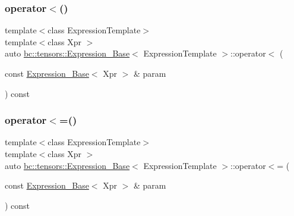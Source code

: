 \subsubsection{\texorpdfstring{operator$<$()}{operator<()}\hspace{0.1cm}{\footnotesize\ttfamily [2/2]}}
{\footnotesize\ttfamily template$<$class Expression\+Template$>$ \\
template$<$class Xpr $>$ \\
auto \hyperlink{classbc_1_1tensors_1_1Expression__Base}{bc\+::tensors\+::\+Expression\+\_\+\+Base}$<$ Expression\+Template $>$\+::operator$<$ (\begin{DoxyParamCaption}\item[{const \hyperlink{classbc_1_1tensors_1_1Expression__Base}{Expression\+\_\+\+Base}$<$ Xpr $>$ \&}]{param }\end{DoxyParamCaption}) const\hspace{0.3cm}{\ttfamily [inline]}}

\mbox{\label{classbc_1_1tensors_1_1Expression__Base_a4bd234d71327653d4aa3b9fd7db21acd}} 
\subsubsection{\texorpdfstring{operator$<$=()}{operator<=()}\hspace{0.1cm}{\footnotesize\ttfamily [1/2]}}
{\footnotesize\ttfamily template$<$class Expression\+Template$>$ \\
template$<$class Xpr $>$ \\
auto \hyperlink{classbc_1_1tensors_1_1Expression__Base}{bc\+::tensors\+::\+Expression\+\_\+\+Base}$<$ Expression\+Template $>$\+::operator$<$= (\begin{DoxyParamCaption}\item[{const \hyperlink{classbc_1_1tensors_1_1Expression__Base}{Expression\+\_\+\+Base}$<$ Xpr $>$ \&}]{param }\end{DoxyParamCaption}) const\hspace{0.3cm}{\ttfamily [inline]}}

\mbox{\label{classbc_1_1tensors_1_1Expression__Base_aaf4129a28684c570bb02aea6c108097b}} 
